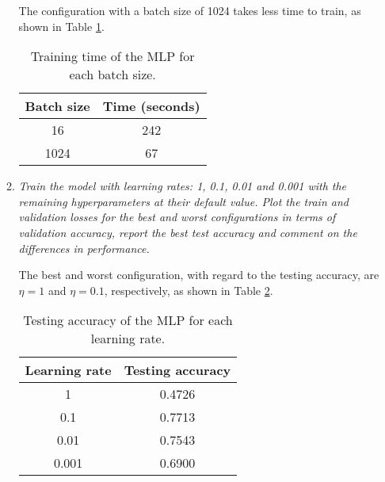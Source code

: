 \documentclass[12pt]{article}
\begin{document}
\begin{enumerate}[leftmargin=\labelsep]
\begin{enumerate}[label=\alph*)]
                    The configuration with a batch size of 1024 takes less time to train, as shown in Table \ref{tab:mlp-batch-size-time}.

                    \vspace{12pt}

                    \begin{table}[H]
                        \centering
                        \begin{tabular}{|c|c|}
                            \hline
                            Batch size & Time (seconds) \\ \hline
                            16         & 242            \\ \hline
                            1024       & 67             \\ \hline
                        \end{tabular}
                        \caption{Training time of the MLP for each batch size.}
                        \label{tab:mlp-batch-size-time}
                    \end{table}

                    \vspace{12pt}

              \item \textit{Train the model with learning rates: 1, 0.1, 0.01 and 0.001 with the remaining
                        hyperparameters at their default value. Plot the train and validation losses for the best
                        and worst configurations in terms of validation accuracy, report the best test accuracy
                        and comment on the differences in performance.}

                    \vspace{12pt}

                    The best and worst configuration, with regard to the testing accuracy, are $\eta = 1$ and $\eta = 0.1$, respectively, as shown in Table \ref{tab:mlp-learning-rate-accuracy}.

                    \begin{table}[H]
                        \centering
                        \begin{tabular}{|c|c|}
                            \hline
                            Learning rate & Testing accuracy \\ \hline
                            1             & 0.4726           \\ \hline
                            0.1           & 0.7713           \\ \hline
                            0.01          & 0.7543           \\ \hline
                            0.001         & 0.6900           \\ \hline
                        \end{tabular}
                        \caption{Testing accuracy of the MLP for each learning rate.}
                        \label{tab:mlp-learning-rate-accuracy}
                    \end{table}


\end{enumerate}
\end{enumerate}
\end{document}
